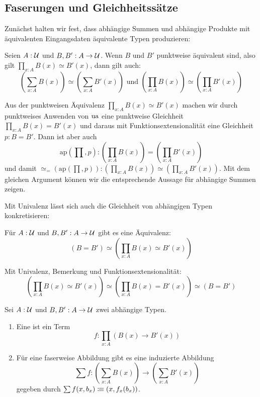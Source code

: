 \subsection{Faserungen und Gleichheitssätze}
Zunächst halten wir fest, dass abhängige Summen und abhängige Produkte mit äquivalenten Eingangsdaten äquivalente Typen produzieren:
\begin{bemerkung}
  \label{bem:ap-univalenz-sigma-prod}
  Seien $A:\mathcal{U}$ und $B,B':A\to\mathcal{U}$. Wenn $B$ und $B'$ punktweise äquivalent sind, also gilt $\prod_{x:A}B(x)\simeq B'(x)$, dann gilt auch:
  \[
    \left(\sum_{x:A}B(x)\right)\simeq \left(\sum_{x:A}B'(x)\right)\text{ und }\left(\prod_{x:A}B(x)\right)\simeq \left(\prod_{x:A}B'(x)\right)
  \]
\end{bemerkung}
\begin{beweis}
  Aus der punktweisen Äquivalenz $\prod_{x:A}B(x)\simeq B'(x)$ machen wir durch punktweises Anwenden von $\mathrm{ua}$ eine punktweise Gleichheit $\prod_{x:A}B(x)=B'(x)$ und daraus mit Funktionsextensionalität eine Gleichheit $p:B=B'$.
  Dann ist aber auch
  \[
    \mathrm{ap}(\prod,p):\left(\prod_{x:A}B(x)\right)=\left(\prod_{x:A}B'(x)\right)
  \]
  und damit $\simeq_=(\mathrm{ap}(\prod,p)):\left(\prod_{x:A}B(x)\right)\simeq\left(\prod_{x:A}B'(x)\right)$.
  Mit dem gleichen Argument können wir die entsprechende Aussage für abhängige Summen zeigen.
\end{beweis}
Mit Univalenz lässt sich auch die Gleichheit von abhängigen Typen konkretisieren:
\begin{bemerkung}
  Für $A:\mathcal{U}$ und $B,B':A\to \mathcal{U}$ gibt es eine Äquivalenz:
  \[
    (B=B') \simeq \left(\prod_{x:A}B(x)\simeq B'(x)\right)
  \]
\end{bemerkung}
\begin{beweis}
  Mit Univalenz, Bemerkung  und Funktionsextensionalität:
  \[
    \left(\prod_{x:A}B(x)\simeq B'(x)\right)\simeq \left(\prod_{x:A}B(x)= B'(x)\right)\simeq (B=B')
  \]
\end{beweis}

\begin{definition}
  Sei $A:\mathcal{U}$ und $B,B':A\to\mathcal{U}$ zwei abhängige Typen.
  \begin{enumerate}
  \item Eine  ist ein Term
    \[
      f:\prod_{x:A}\left(B(x)\to B'(x)\right)
    \]
  \item Für eine faserweise Abbildung gibt es eine induzierte Abbildung
    \[
      \sum f:\left(\sum_{x:A}B(x)\right)\to \left(\sum_{x:A} B'(x)\right)
    \]
    gegeben durch $\sum f(x,b_x)\vcentcolon\mspace{-1.2mu}\equiv (x,f_x(b_x))$.
  \end{enumerate}
\end{definition}

